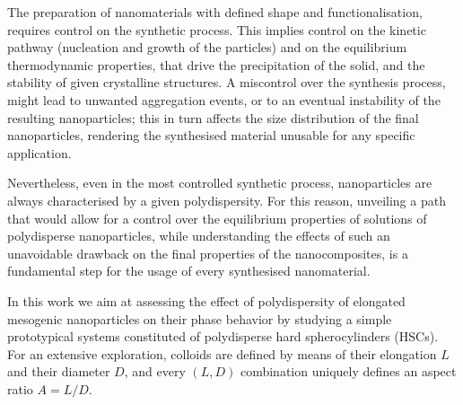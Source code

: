 \documentclass[journal=jacsat,manuscript=article]{achemso}
\begin{document}

The preparation of  nanomaterials with defined shape and functionalisation, requires  control on the synthetic process.
This implies control on the kinetic pathway (nucleation and growth of the particles) and on the equilibrium
thermodynamic properties, that drive the precipitation of the solid, and the stability of given crystalline structures. 
A miscontrol over the synthesis process, might lead to unwanted aggregation events, or to an eventual instability of the
resulting nanoparticles; this in turn affects the size distribution of the final nanoparticles, rendering the
synthesised material unusable for any specific application.


Nevertheless, even in the most controlled synthetic process, nanoparticles are always characterised by a given
polydispersity. For this reason, unveiling a path that would allow for a control over the equilibrium properties of
solutions of polydisperse nanoparticles, while understanding the effects of such an unavoidable drawback on the final
properties of the nanocomposites, is a fundamental step for the usage of every synthesised nanomaterial.

In this work we aim at assessing the effect of polydispersity of elongated mesogenic nanoparticles on their phase behavior
by studying a simple prototypical systems constituted of polydisperse hard spherocylinders (HSCs). 
For an extensive exploration, colloids are defined by means of their elongation  $L$ and their diameter $D$, and every $(L,D)$ combination uniquely defines an aspect ratio $A=L/D$. 
\end{document}
